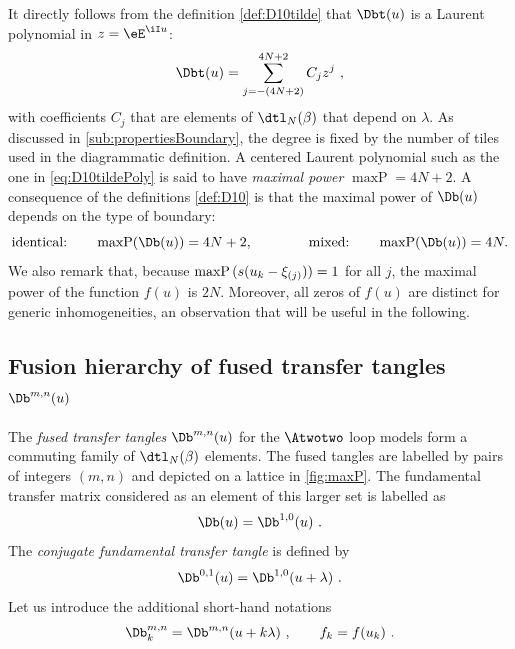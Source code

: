 \documentclass[11pt]{article}
\numberwithin{equation}{section}
\theoremstyle{alexi}
\DeclareMathOperator{\maxP}{maxP}
\begin{document}
It directly follows from the definition \eqref{def:D10tilde} that $\Dbt(u)$ is a Laurent polynomial in $z=\eE^{\iI u}$:
\begin{equation} \label{eq:D10tildePoly}
\Dbt(u) = \sum_{j=-(4N+2)}^{4N+2} C_j z^j \ ,
\end{equation} 
with coefficients $C_j$ that are elements of $\dtl_N(\beta)$ that depend on $\lambda$. As discussed in \cref{sub:propertiesBoundary}, the degree is fixed by the number of tiles used in the diagrammatic definition. A centered Laurent polynomial such as the one in \eqref{eq:D10tildePoly} is said to have \textit{maximal power} $\maxP=4N+2$. A consequence of the definitions \eqref{def:D10} is that the maximal power of $\Db(u)$ depends on the type of boundary:
\begin{equation}
\text{identical:} \qquad\maxP(\Db(u)) = 4N+2, \qquad\qquad
\text{mixed:} \qquad\maxP(\Db(u)) = 4N.
\end{equation}
We also remark that, because $\text{maxP\,}(s(u_k-\xi_{(j)}))=1$ for all $j$, the maximal power of the function $f(u)$ is $2N$. Moreover, all zeros of $f(u)$ are distinct for generic inhomogeneities, an observation that will be useful in the following.

\subsection{Fusion hierarchy of fused transfer tangles $\Db^{m,n}(u)$} \label{sub:fused.with.relations}

The \textit{fused transfer tangles} $\Db^{m,n}(u)$ for the $\Atwotwo$ loop models form a commuting family of $\dtl_N(\beta)$ elements. The fused tangles are labelled by pairs of integers $(m,n)$ and depicted on a lattice in \cref{fig:maxP}. The fundamental transfer matrix considered as an element of this larger set is labelled as
\begin{equation}
\Db(u) = \Db^{1,0}(u) \ .
\end{equation}
The \textit{conjugate fundamental transfer tangle} is defined by
\begin{equation} \label{def:D01}
\Db^{0,1}(u) = \Db^{1,0}(u+\lambda) \ .
\end{equation}
Let us introduce the additional short-hand notations
\begin{equation} \label{def:Db_k}
\Db^{m,n}_k = \Db^{m,n}(u+k\lambda) \ , \qquad f_k = f(u_k)\ .
\end{equation}
\end{document}
